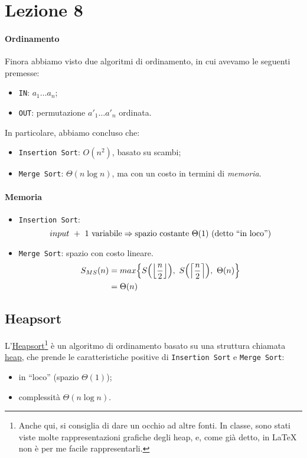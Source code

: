 \section{Lezione 8}
\paragraph{Ordinamento} Finora abbiamo visto due algoritmi di ordinamento, in cui avevamo le seguenti 
premesse:
\begin{itemize}
	\item[] \texttt{IN}: $a_1\dots a_n$;
	\item[] \texttt{OUT}: permutazione $a'_1\dots a'_n$ ordinata.
\end{itemize}
In particolare, abbiamo concluso che:
\begin{itemize}
	\item \texttt{Insertion Sort}: $O(n^2)$, basato su scambi;
	\item \texttt{Merge Sort}: $\Theta(n \log n)$, ma con un costo in termini di \emph{memoria}.
\end{itemize}

\paragraph{Memoria} 
\begin{itemize}
	\item \texttt{Insertion Sort}: 
	$$input \ + \ 1 \text{ variabile} \Rightarrow 
		\text{spazio \emph{costante} } \Theta (1) \text{ (detto ``in loco'')}$$
	\item \texttt{Merge Sort}: spazio con costo lineare.
	\begin{align*}
		S_{MS}(n) & = max\Big{\{} S\Big( \Big{\lfloor}{\frac{n}{2}}\Big{\rfloor} \Big), 
		\ S\Big( \Big{\lceil}{\frac{n}{2}}\Big{\rceil} \Big), \ \Theta (n) \Big{\}} \\
		& = \Theta (n)
	\end{align*}
\end{itemize}

\subsection{Heapsort} \label{heapsort} 
L'\href{https://en.wikipedia.org/wiki/Heapsort}{Heapsort}\footnote{Anche qui, si consiglia di dare %
un occhio ad altre fonti. In classe, sono stati viste molte rappresentazioni grafiche degli heap, %
e, come già detto, in \LaTeX $\ $non è per me facile rappresentarli.} è un algoritmo di ordinamento 
basato su 
una struttura chiamata \href{https://en.wikipedia.org/wiki/Heap_(data_structure)}{heap}, che prende le caratteristiche positive di 
\texttt{Insertion Sort} e \texttt{Merge Sort}:
\begin{itemize}[noitemsep]
	\item in ``loco'' (spazio $\Theta (1)$);
	\item complessità $\Theta(n \log n)$.
\end{itemize}


